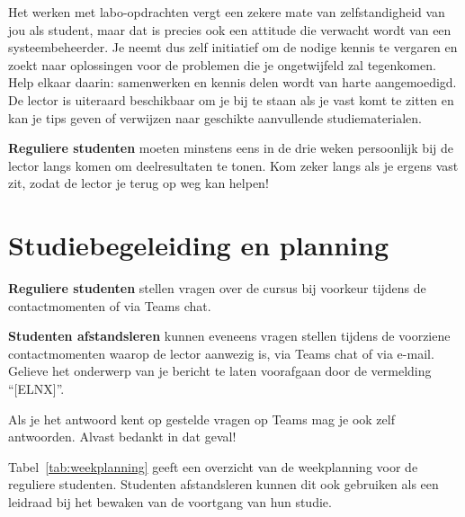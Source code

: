 Het werken met labo-opdrachten vergt een zekere mate van zelfstandigheid van jou als student, maar dat is precies ook een attitude die verwacht wordt van een systeembeheerder. Je neemt dus zelf initiatief om de nodige kennis te vergaren en zoekt naar oplossingen voor de problemen die je ongetwijfeld zal tegenkomen. Help elkaar daarin: samenwerken en kennis delen wordt van harte aangemoedigd. De lector is uiteraard beschikbaar om je bij te staan als je vast komt te zitten en kan je tips geven of verwijzen naar geschikte aanvullende studiematerialen.

\textbf{Reguliere studenten} moeten minstens eens in de drie weken persoonlijk bij de lector langs komen om deelresultaten te tonen. Kom zeker langs als je ergens vast zit, zodat de lector je terug op weg kan helpen!

\section{Studiebegeleiding en planning}%
\label{sec:studiebegeleiding-en-planning}

\textbf{Reguliere studenten} stellen vragen over de cursus bij voorkeur tijdens de contactmomenten of via Teams chat.

\textbf{Studenten afstandsleren} kunnen eveneens vragen stellen tijdens de voorziene contactmomenten waarop de lector aanwezig is, via Teams chat of via e-mail. Gelieve het onderwerp van je bericht te laten voorafgaan door de vermelding ``[ELNX]''.

Als je het antwoord kent op gestelde vragen op Teams mag je ook zelf antwoorden. Alvast bedankt in dat geval!

Tabel~\ref{tab:weekplanning} geeft een overzicht van de weekplanning voor de reguliere studenten. Studenten afstandsleren kunnen dit ook gebruiken als een leidraad bij het bewaken van de voortgang van hun studie.

